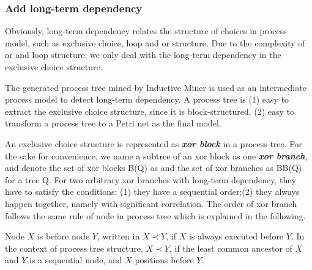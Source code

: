 \subsubsection{Add long-term dependency}
Obviously, long-term dependency relates the structure of choices in process model, such as exclusive choice, loop and or structure. Due to the complexity of or and loop structure, we only deal with the long-term dependency in the exclusive choice structure. 

The generated process tree mined by Inductive Miner is used as an intermediate process model to detect long-term dependency.  A process tree is  (1) easy to extract the exclusive choice structure, since it is block-structured. (2) easy to transform a process tree to a Petri net as the final model.

An exclusive choice structure is represented as \textbf{\emph{xor block}} in a process tree. For the sake for convenience, we name a subtree of an xor block as one \textbf{\emph{xor branch}}, and denote the set of xor blocks B(Q) as and the set of xor branches as BB(Q) for a tree Q.
For two arbitrary xor branches with long-term dependency, they have to satisfy the conditions: (1) they have a sequential order;(2) they always happen together, namely with significant correlation.
The order of xor branch follows the same rule of node in process tree which is explained in the following.
\begin{definition}
	Node $X$ is before node $Y$, written in $X \prec Y$, if $X$ is always executed before $Y$.  In the context of process tree structure, $X \prec Y$, if the least common ancestor of $X$ and $Y$ is a sequential node, and $X$ positions before $Y$.
\end{definition} 

